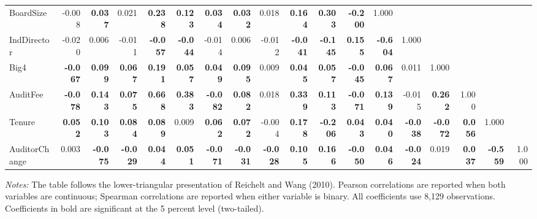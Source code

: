 \begin{landscape}
\begin{table}[p]
{\begin{tabular}{lrrrrrrrrrrrrrrrrr}
BoardSize & -0.008 & \textbf{0.037} & 0.021 & \textbf{0.238} & \textbf{0.123} & \textbf{0.034} & \textbf{0.032} & 0.018 & \textbf{0.164} & \textbf{0.303} & \textbf{-0.200} & 1.000 &  &  &  &  & \\
IndDirector & -0.020 & 0.006 & -0.011 & \textbf{-0.057} & \textbf{-0.044} & -0.014 & 0.006 & -0.012 & \textbf{-0.041} & \textbf{-0.145} & \textbf{0.155} & \textbf{-0.604} & 1.000 &  &  &  & \\
Big4 & \textbf{-0.067} & \textbf{0.099} & \textbf{0.067} & \textbf{0.191} & \textbf{0.057} & \textbf{0.049} & \textbf{0.095} & 0.009 & \textbf{0.045} & \textbf{0.057} & \textbf{-0.045} & \textbf{0.067} & 0.011 & 1.000 &  &  & \\
AuditFee & \textbf{-0.078} & \textbf{0.143} & \textbf{0.075} & \textbf{0.668} & \textbf{0.383} & \textbf{-0.082} & \textbf{0.082} & 0.018 & \textbf{0.339} & \textbf{0.113} & \textbf{-0.071} & \textbf{0.139} & -0.015 & \textbf{0.262} & 1.000 &  & \\
Tenure & \textbf{0.052} & \textbf{0.103} & \textbf{0.084} & \textbf{0.089} & 0.009 & \textbf{0.062} & \textbf{0.072} & -0.004 & \textbf{0.178} & \textbf{-0.206} & \textbf{0.043} & \textbf{0.040} & \textbf{-0.038} & \textbf{-0.072} & \textbf{0.056} & 1.000 & \\
AuditorChange & 0.003 & \textbf{-0.075} & \textbf{-0.029} & \textbf{0.044} & \textbf{0.051} & \textbf{-0.071} & \textbf{-0.031} & \textbf{-0.028} & \textbf{0.105} & \textbf{0.166} & \textbf{-0.050} & \textbf{0.046} & \textbf{-0.024} & 0.019 & \textbf{0.037} & \textbf{-0.559} & 1.000\\
\hline\end{tabular}}
\begin{minipage}{0.98\textwidth}\footnotesize\textit{Notes:} The table follows the lower-triangular presentation of Reichelt and Wang (2010). Pearson correlations are reported when both variables are continuous; Spearman correlations are reported when either variable is binary. All coefficients use 8,129 observations. Coefficients in bold are significant at the 5 percent level (two-tailed).\end{minipage}
\end{table}
\end{landscape}